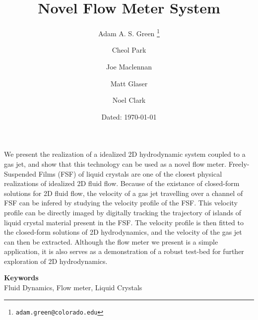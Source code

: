 \documentclass{article} %
\date{} %
\def\keywords#1{\begin{center}{\bf Keywords}\\{#1}\end{center}} %
\begin{document}
\title{Novel Flow Meter System}

\author{Adam A. S. Green%
\thanks{\texttt{adam.green@colorado.edu}}}
\author{Cheol Park}
\author{Joe Maclennan}
\author{Matt Glaser}
\author{Noel Clark}

 
\date{Dated: \today}

\maketitle

\thispagestyle{empty}



\begin{doublespace}
\noindent We present the realization of a idealized 2D hydrodynamic system
coupled to a
gas jet, and show that this technology can be used as a novel flow meter.
Freely-Suspended Films (FSF) of liquid crystals are one of the closest physical realizations of
idealized 2D fluid flow. Because of the  existance of closed-form solutions for 2D
fluid flow, the velocity of a gas jet travelling over a channel of FSF can be
infered by studying the velocity profile of the FSF. This velocity profile can be
directly imaged by digitally tracking the trajectory of islands of liquid
crystal material present in the FSF. The velocity profile is then fitted to the
closed-form solutions of 2D hydrodynamics, and the velocity of the gas jet can
then be extracted. Although the flow meter we present is a simple
application, it is also serves as a demonstration
of a robust test-bed for further exploration of 2D hydrodynamics.
\end{doublespace}
\vspace{20 mm}
\keywords{Fluid Dynamics, Flow meter, Liquid Crystals} %




                    
\end{document}

